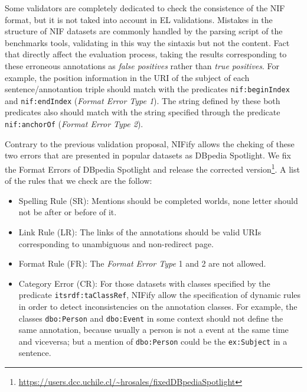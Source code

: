 \documentclass{llncs}
\begin{document}
Some validators are completely dedicated to check the consistence of the NIF format, but it is not taked into account in EL validations. Mistakes in the structure of NIF datasets are commonly handled by the parsing script of the benchmarks tools, validating in this way the sintaxis but not the content. Fact that directly affect the evaluation process, taking the results corresponding to these erroneous annotations as \textit{false positives} rather than \textit{true positives}. For example, the position information in the URI of the subject of each sentence/annotantion triple should match with the predicates \texttt{nif:beginIndex} and \texttt{nif:endIndex} (\textit{Format Error Type 1}). The string defined by these both predicates also should match with the string specified through the predicate \texttt{nif:anchorOf} (\textit{Format Error Type 2}). 

Contrary to the previous validation proposal, NIFify allows the cheking of these two errors that are presented in popular datasets as DBpedia Spotlight. We fix the Format Errors of DBpedia Spotlight and release the corrected version\footnote{\url{https://users.dcc.uchile.cl/~hrosales/fixedDBpediaSpotlight}}. A list of the rules that we check are the follow:

\begin{itemize} 
\item Spelling Rule (SR): Mentions should be completed worlds, none letter should not be after or before of it.
\item Link Rule (LR): The links of the annotations should be valid URIs corresponding to unambiguous and non-redirect page.
\item Format Rule (FR): The \textit{Format Error Type} 1 and 2 are not allowed.
\item Category Error (CR): For those datasets with classes specified by the predicate \texttt{itsrdf:taClassRef}, NIFify allow the specification of dynamic rules in order to detect inconsistencies on the annotation classes. For example, the classes \texttt{dbo:Person} and \texttt{dbo:Event} in some context should not define the same annotation, because usually a person is not a event at the same time and viceversa; but a mention of \texttt{dbo:Person} could be the \texttt{ex:Subject} in a sentence. 
\end{itemize}
\end{document}
